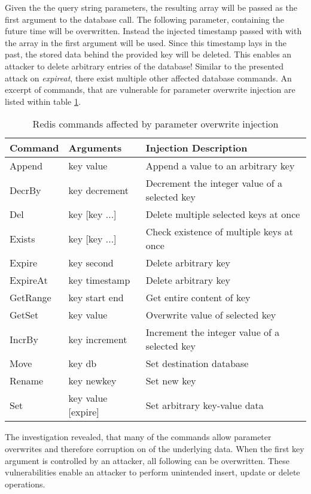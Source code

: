 Given the the query string parameters, the resulting array will be passed as the first argument to the database call. The following parameter, containing the future time will be overwritten. Instead the injected timestamp passed with with the array in the first argument will be used. Since this timestamp lays in the past, the stored data behind the provided key will be deleted. This enables an attacker to delete arbitrary entries of the database! Similar to the presented attack on \emph{expireat}, there exist multiple other affected database commands. An excerpt of commands, that are vulnerable for parameter overwrite injection are listed within table \ref{tab:redis_commands_affected}. \\

\begin{table}[h]
 \sffamily
 \centering
 \begin{tabular}{lll}
  \textbf{Command} & \textbf{Arguments} & \textbf{Injection Description} \\ \hline
  Append  & key value       & Append a value to an arbitrary key\\
  DecrBy  & key decrement   & Decrement the integer value of a selected key \\
  Del     & key [key ...]   & Delete multiple selected keys at once \\
  Exists  & key [key ...]   & Check existence of multiple keys at once \\
  Expire  & key second      & Delete arbitrary key \\
  ExpireAt& key timestamp & Delete arbitrary key \\
  GetRange& key start end & Get entire content of key \\
  GetSet  & key value & Overwrite value of selected key \\
  IncrBy  & key increment & Increment the integer value of a selected key \\
  Move    & key db & Set destination database \\
  Rename  & key newkey & Set new key \\
  Set     & key value [expire] & Set arbitrary key-value data \\
  \bottomrule 
 \end{tabular}
 \caption{Redis commands affected by parameter overwrite injection}
 \label{tab:redis_commands_affected}
\end{table}

The investigation revealed, that many of the commands allow parameter overwrites and therefore corruption on of the underlying data. When the first key argument is controlled by an attacker, all following can be overwritten. These vulnerabilities enable an attacker to perform unintended insert, update or delete operations.

